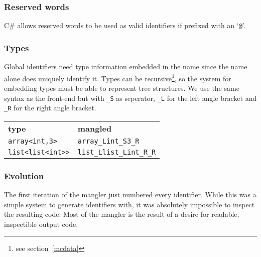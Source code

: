\subsubsection{Reserved words}
C\# allows reserved words to be used as valid identifiers if prefixed with an `\verb|@|'\cite{msdn_identifiers}.

\subsubsection{Types}
Global identifiers need type information embedded in the name since the name alone does uniquely identify it.
Types can be recursive\footnote{see section~\ref{mcdata}}, so the system for embedding types must be able to represent tree structures.
We use the same syntax as the front-end but with \verb|_S| as seperator, \verb|_L| for the left angle bracket and \verb|_R| for the right angle bracket.

{\footnotesize
\begin{tabular}{ll}
\textbf{\normalsize type}          & \textbf{\normalsize mangled} \\
\verb|array<int,3>|    & \verb|array_Lint_S3_R| \\
\verb|list<list<int>>| & \verb|list_Llist_Lint_R_R| \\
\end{tabular}
}

\subsubsection{Evolution}
The first iteration of the mangler just numbered every identifier.
While this was a simple system to generate identifiers with, it was absolutely impossible to inspect the resulting code.
Most of the mangler is the result of a desire for readable, inspectible output code.

